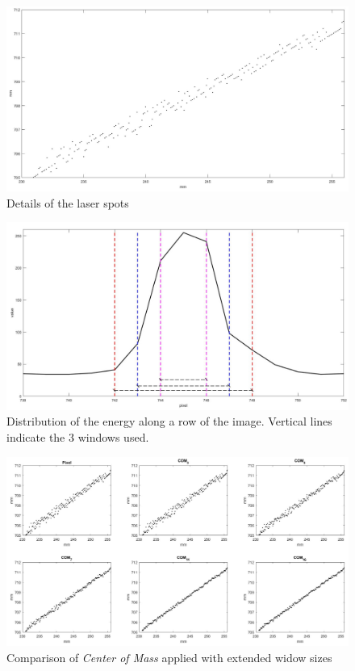 \vfill
\begin{figure}
  \centering
  \includegraphics[width=\textwidth]{./images/analysis/t1/pixel_profile_det.jpg}
  \caption{Details of the laser spots}
  \label{fig:c5-profile_pixel_det}
\end{figure}
\vfill
\begin{figure}
  \centering
  \includegraphics[width=\textwidth]{./images/analysis/t1/peak_distrib.jpg}
  \caption{Distribution of the energy along a row of the image. Vertical lines indicate the 3 windows used.}
  \label{fig:c5-peak_distrib}
\end{figure}
\vfill
\begin{figure}
  \centering
  \includegraphics[width=\textwidth]{./images/analysis/t1/com6_cmp.jpg}
  \caption{Comparison of \textit{Center of Mass} applied with extended widow sizes}
  \label{fig:c5-com_cmp_6}
\end{figure}
